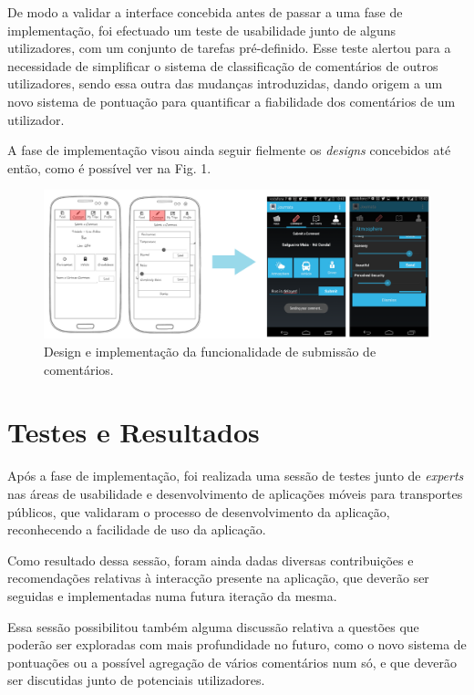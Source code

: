 \documentclass[9pt,a4paper]{extarticle}
\begin{document}
\begin{multicols}{2}
De modo a validar a interface concebida antes de passar a uma fase de implementação, foi efectuado um teste de usabilidade junto de alguns utilizadores, com um conjunto de tarefas pré-definido. Esse teste alertou para a necessidade de simplificar o sistema de classificação de comentários de outros utilizadores, sendo essa outra das mudanças introduzidas, dando origem a um novo sistema de pontuação para quantificar a fiabilidade dos comentários de um utilizador.

A fase de implementação visou ainda seguir fielmente os \emph{designs} concebidos até então, como é possível ver na Fig. 1.

\begin{figure}[H]
\centerline{\includegraphics[scale=.15]{artigo.png}}
\caption{Design e implementação da funcionalidade de submissão de comentários.}  
\label{fig:figura}
\end{figure}


\section{Testes e Resultados}

Após a fase de implementação, foi realizada uma sessão de testes junto de \emph{experts} nas áreas de usabilidade e desenvolvimento de aplicações móveis para transportes públicos, que validaram o processo de desenvolvimento da aplicação, reconhecendo a facilidade de uso da aplicação.

Como resultado dessa sessão, foram ainda dadas diversas contribuições e recomendações relativas à interacção presente na aplicação, que deverão ser seguidas e implementadas numa futura iteração da mesma.

Essa sessão possibilitou também alguma discussão relativa a questões que poderão ser exploradas com mais profundidade no futuro, como o novo sistema de pontuações ou a possível agregação de vários comentários num só, e que deverão ser discutidas junto de potenciais utilizadores.


\end{multicols}
\end{document}
